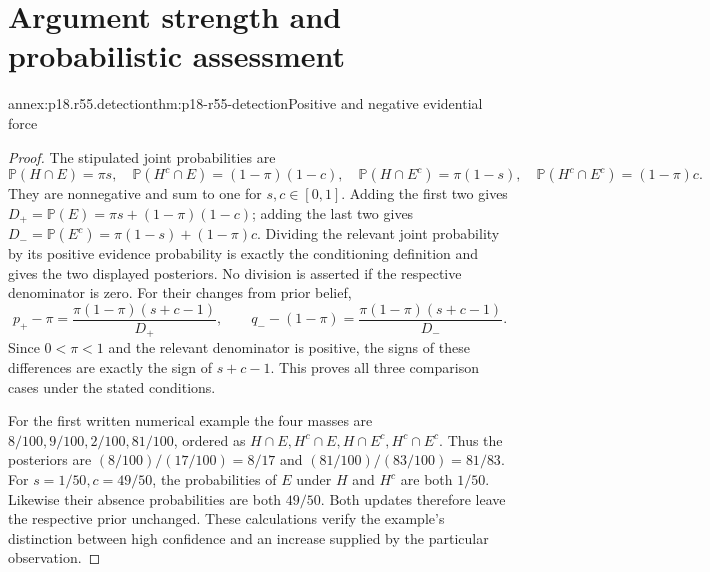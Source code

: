 \section{Argument strength and probabilistic assessment}
\label{sec:p18-r55-proofs}

\begin{annexitem}{annex:p18.r55.detection}{thm:p18-r55-detection}{Positive and negative evidential force}
\begin{proof}
The stipulated joint probabilities are
\[
 \mathbb P(H\cap E)=\pi s,\quad
 \mathbb P(H^c\cap E)=(1-\pi)(1-c),\quad
 \mathbb P(H\cap E^c)=\pi(1-s),\quad
 \mathbb P(H^c\cap E^c)=(1-\pi)c.
\]
They are nonnegative and sum to one for \(s,c\in[0,1]\).
Adding the first two gives
\(D_+=\mathbb P(E)=\pi s+(1-\pi)(1-c)\);
adding the last two gives
\(D_-=\mathbb P(E^c)=\pi(1-s)+(1-\pi)c\).
Dividing the relevant joint probability by its positive evidence
probability is exactly the conditioning definition and gives the
two displayed posteriors. No division is asserted if the respective
denominator is zero. For their changes from prior belief,
\[
 p_+-\pi=\frac{\pi(1-\pi)(s+c-1)}{D_+},\qquad
 q_--(1-\pi)=\frac{\pi(1-\pi)(s+c-1)}{D_-}.
\]
Since \(0<\pi<1\) and the relevant denominator is positive,
the signs of these differences are exactly the sign of \(s+c-1\).
This proves all three comparison cases under the stated conditions.

For the first written numerical example the four masses are
\(8/100,9/100,2/100,81/100\), ordered as
\(H\cap E,H^c\cap E,H\cap E^c,H^c\cap E^c\).
Thus the posteriors are \((8/100)/(17/100)=8/17\)
and \((81/100)/(83/100)=81/83\).
For \(s=1/50,c=49/50\), the probabilities of \(E\)
under \(H\) and \(H^c\) are both \(1/50\).
Likewise their absence probabilities are both \(49/50\).
Both updates therefore leave the respective prior unchanged.
These calculations verify the example's distinction between high
confidence and an increase supplied by the particular observation.
\end{proof}
\end{annexitem}

